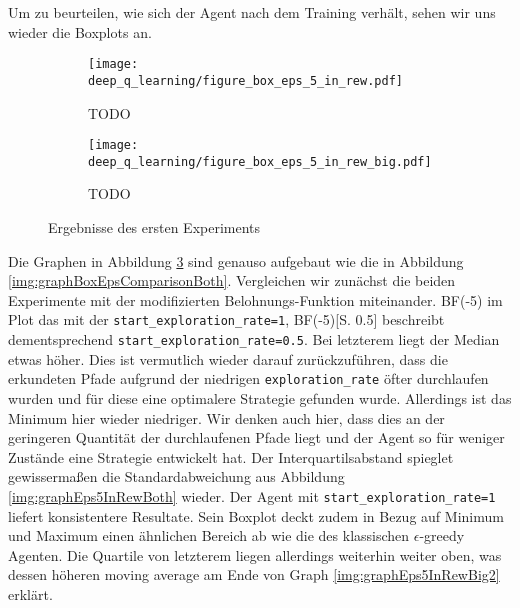 Um zu beurteilen, wie sich der Agent nach dem Training verhält, sehen wir uns wieder die Boxplots an.

\begin{figure}[h!]
    \centering
    \begin{subfigure}[b]{0.7\textwidth}
        \texttt{[image: deep\_q\_learning/figure\_box\_eps\_5\_in\_rew.pdf]}
        \caption{TODO}
        \label{img:graphBoxEps5InRew}
    \end{subfigure}
    \begin{subfigure}[b]{0.7\textwidth}
        \texttt{[image: deep\_q\_learning/figure\_box\_eps\_5\_in\_rew\_big.pdf]}
        \caption{TODO}
        \label{img:graphBoxEps5InRewBig}
    \end{subfigure}
    \caption{Ergebnisse des ersten Experiments}
    \label{img:graphBoxEps5InRewBoth}
\end{figure}

Die Graphen in Abbildung \ref{img:graphBoxEps5InRewBoth} sind genauso aufgebaut wie die in Abbildung \ref{img:graphBoxEpsComparisonBoth}. Vergleichen wir zunächst die beiden Experimente mit der modifizierten Belohnungs-Funktion miteinander. BF(-5) im Plot das mit der \texttt{start_exploration_rate=1}, BF(-5)[S. 0.5] beschreibt dementsprechend \texttt{start_exploration_rate=0.5}. Bei letzterem liegt der Median etwas höher. Dies ist vermutlich wieder darauf zurückzuführen, dass die erkundeten Pfade aufgrund der niedrigen \texttt{exploration_rate} öfter durchlaufen wurden und für diese eine optimalere Strategie gefunden wurde. Allerdings ist das Minimum hier wieder niedriger. Wir denken auch hier, dass dies an der geringeren Quantität der durchlaufenen Pfade liegt und der Agent so für weniger Zustände eine Strategie entwickelt hat. Der Interquartilsabstand spieglet gewissermaßen die Standardabweichung aus Abbildung \ref{img:graphEps5InRewBoth} wieder. Der Agent mit \texttt{start_exploration_rate=1} liefert konsistentere Resultate. Sein Boxplot deckt zudem in Bezug auf Minimum und Maximum einen ähnlichen Bereich ab wie die des klassischen $ \epsilon $-greedy Agenten. Die Quartile von letzterem liegen allerdings weiterhin weiter oben, was dessen höheren moving average am Ende von Graph \ref{img:graphEps5InRewBig2} erklärt.

